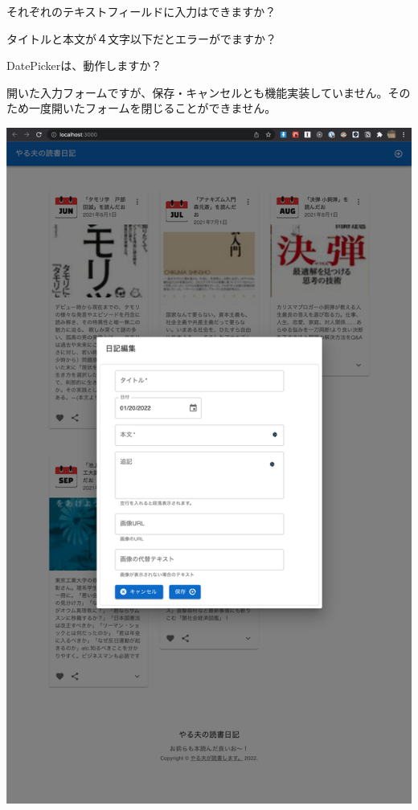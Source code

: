 \begin{starteritemize}
\item それぞれのテキストフィールドに入力はできますか？
\item タイトルと本文が４文字以下だとエラーがでますか？
\item DatePickerは、動作しますか？
\end{starteritemize}

開いた入力フォームですが、保存・キャンセルとも機能実装していません。そのため一度開いたフォームを閉じることができません。


\clearpage

\begin{reviewimage}%
\includegraphics[width=0.7\maxwidth]{./images/03-todo-with-react/mui018-DiaryForm-done.png}%
\label{image:03-todo-with-react:mui018-DiaryForm-done}
\end{reviewimage}

